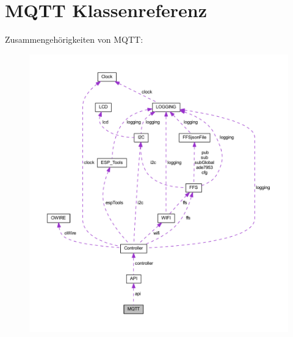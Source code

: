 \hypertarget{class_m_q_t_t}{}\section{M\+Q\+TT Klassenreferenz}
\label{class_m_q_t_t}


Zusammengehörigkeiten von M\+Q\+TT\+:\nopagebreak
\begin{figure}[H]
\begin{center}
\leavevmode
\includegraphics[width=350pt]{class_m_q_t_t__coll__graph}
\end{center}
\end{figure}
